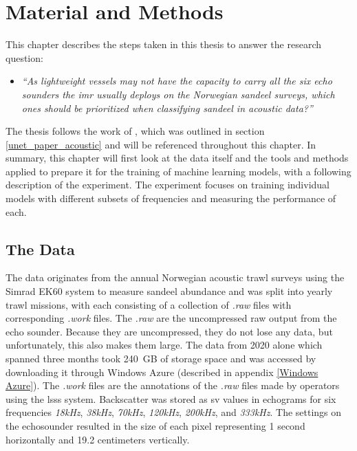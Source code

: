 \chapter{Material and Methods} \label{methods}
    This chapter describes the steps taken in this thesis to answer the research question:
        \begin{itemize}
            \item \textit{“As lightweight vessels may not have the capacity to carry all the six echo sounders the \gls{imr} usually deploys on the Norwegian sandeel surveys, which ones should be prioritized when classifying sandeel in acoustic data?”}
        \end{itemize}
    
    The thesis follows the work of \citeauthor{brautaset2020acoustic}\cite{brautaset2020acoustic}, which was outlined in section \ref{unet_paper_acoustic} and will be referenced throughout this chapter. In summary, this chapter will first look at the data itself and the tools and methods applied to prepare it for the training of machine learning models, with a following description of the experiment. The experiment focuses on training individual models with different subsets of frequencies and measuring the performance of each.
    
    \section{The Data}
        The data originates from the annual Norwegian acoustic trawl surveys using the Simrad EK60 system to measure sandeel abundance and was split into yearly trawl missions, with each consisting of a collection of \textit{.raw} files with corresponding \textit{.work} files. The \textit{.raw} are the uncompressed raw output from the echo sounder. Because they are uncompressed, they do not lose any data, but unfortunately, this also makes them large. The data from 2020 alone which spanned three months took 240 GB of storage space and was accessed by downloading it through Windows Azure (described in appendix \ref{Windows Azure}). The \textit{.work} files are the annotations of the \textit{.raw} files made by operators using the \gls{lsss} system. Backscatter was stored as \gls{sv} values in echograms for six frequencies \textit{18kHz}, \textit{38kHz}, \textit{70kHz}, \textit{120kHz}, \textit{200kHz}, and \textit{333kHz}. The settings on the echosounder resulted in the size of each pixel representing 1 second horizontally and 19.2 centimeters vertically\cite{choi2021semi}.
    
